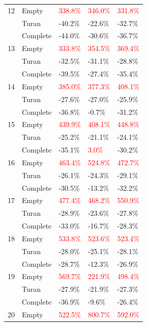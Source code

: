 \documentclass[12pt,a4paper]{article}
\begin{document}
\begin{longtable}{|l||l|l|l|l|}
  \hline
  12 & Empty & \textcolor{red}{338.8\%} & \textcolor{red}{346.0\%} & \textcolor{red}{331.8\%} \\
  & Turan & -40.2\% & -22.6\% & -32.7\% \\
  & Complete & -44.0\% & -30.6\% & -36.7\% \\
  \hline
  13 & Empty & \textcolor{red}{333.8\%} & \textcolor{red}{354.5\%} & \textcolor{red}{369.4\%} \\
  & Turan & -32.5\% & -31.1\% & -28.8\% \\
  & Complete & -39.5\% & -27.4\% & -35.4\% \\
  \hline
  14 & Empty & \textcolor{red}{385.0\%} & \textcolor{red}{377.3\%} & \textcolor{red}{408.1\%} \\
  & Turan & -27.6\% & -27.0\% & -25.9\% \\
  & Complete & -36.8\% & -0.7\% & -31.2\% \\
  \hline
  15 & Empty & \textcolor{red}{439.9\%} & \textcolor{red}{408.1\%} & \textcolor{red}{448.8\%} \\
  & Turan & -25.2\% & -21.1\% & -24.1\% \\
  & Complete & -35.1\% & \textcolor{red}{3.0\%} & -30.2\% \\
  \hline
  16 & Empty & \textcolor{red}{463.4\%} & \textcolor{red}{524.8\%} & \textcolor{red}{472.7\%} \\
  & Turan & -26.1\% & -24.3\% & -29.1\% \\
  & Complete & -30.5\% & -13.2\% & -32.2\% \\
  \hline
  17 & Empty & \textcolor{red}{477.4\%} & \textcolor{red}{468.2\%} & \textcolor{red}{550.9\%} \\
  & Turan & -28.9\% & -23.6\% & -27.8\% \\
  & Complete & -33.0\% & -16.7\% & -28.3\% \\
  \hline
  18 & Empty & \textcolor{red}{533.8\%} & \textcolor{red}{523.6\%} & \textcolor{red}{523.4\%} \\
  & Turan & -28.0\% & -25.1\% & -28.1\% \\
  & Complete & -28.7\% & -12.3\% & -26.9\% \\
  \hline
  19 & Empty & \textcolor{red}{569.7\%} & \textcolor{red}{221.9\%} & \textcolor{red}{498.4\%} \\
  & Turan & -27.9\% & -21.9\% & -27.3\% \\
  & Complete & -36.9\% & -9.6\% & -26.4\% \\
  \hline
  20 & Empty & \textcolor{red}{522.5\%} & \textcolor{red}{800.7\%} & \textcolor{red}{592.0\%} \\

\end{longtable}
\end{document}
